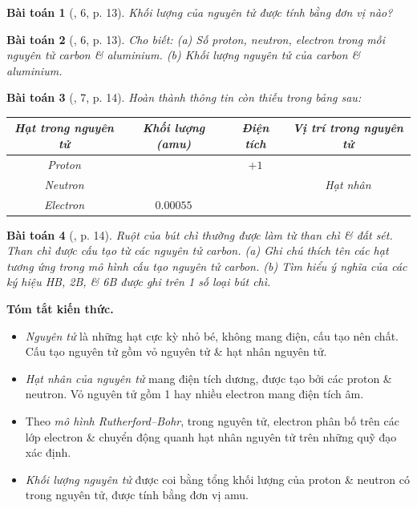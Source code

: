 \documentclass{article}
\newtheorem{baitoan}{Bài toán}
\begin{document}
\begin{baitoan}[\cite{SGK_KHTN_7_Canh_Dieu}, 6, p. 13]
	Khối lượng của nguyên tử được tính bằng đơn vị nào?
\end{baitoan}

\begin{baitoan}[\cite{SGK_KHTN_7_Canh_Dieu}, 6, p. 13]
	Cho biết: (a) Số proton, neutron, electron trong mỗi nguyên tử carbon \& aluminium. (b) Khối lượng nguyên tử của carbon \& aluminium.
\end{baitoan}

\begin{baitoan}[\cite{SGK_KHTN_7_Canh_Dieu}, 7, p. 14]
	Hoàn thành thông tin còn thiếu trong bảng sau:
	\begin{table}[H]
		\centering
		\begin{tabular}{|c|c|c|c|}
			\hline
			\textbf{Hạt trong nguyên tử} & \textbf{Khối lượng (amu)} & \textbf{Điện tích} & \textbf{Vị trí trong nguyên tử} \\
			\hline
			Proton &  & $+1$ &  \\
			\hline
			Neutron &  &  & Hạt nhân \\
			\hline
			Electron & $0.00055$ &  &  \\
			\hline
		\end{tabular}
	\end{table}
\end{baitoan}

\begin{baitoan}[\cite{SGK_KHTN_7_Canh_Dieu}, p. 14]
	Ruột của bút chì thường được làm từ than chì \& đất sét. Than chì được cấu tạo từ các nguyên tử carbon. (a) Ghi chú thích tên các hạt tương ứng trong mô hình cấu tạo nguyên tử carbon. (b) Tìm hiểu ý nghĩa của các ký hiệu HB, 2B, \& 6B được ghi trên 1 số loại bút chì.
\end{baitoan}
\noindent\textsf{\textbf{Tóm tắt kiến thức.}}
\begin{itemize}
	\item \textit{Nguyên tử} là những hạt cực kỳ nhỏ bé, không mang điện, cấu tạo nên chất. Cấu tạo nguyên tử gồm vỏ nguyên tử \& hạt nhân nguyên tử.
	\item \textit{Hạt nhân của nguyên tử} mang điện tích dương, được tạo bởi các proton \& neutron. Vỏ nguyên tử gồm 1 hay nhiều electron mang điện tích âm.
	\item Theo \textit{mô hình Rutherford--Bohr}, trong nguyên tử, electron phân bố trên các lớp electron \& chuyển động quanh hạt nhân nguyên tử trên những quỹ đạo xác định.
	\item \textit{Khối lượng nguyên tử} được coi bằng tổng khối lượng của proton \& neutron có trong nguyên tử, được tính bằng đơn vị amu.
\end{itemize}
\end{document}
